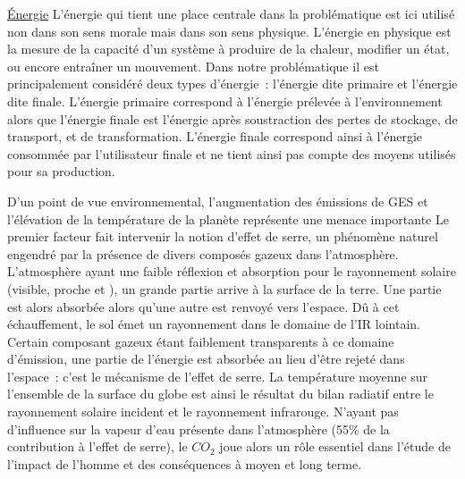\href{https://fr.wikipedia.org/wiki/%C3%89nergie_(physique)}{Énergie}
L’énergie qui tient une place centrale dans la problématique est ici utilisé non dans
son sens morale mais dans son sens physique. L’énergie en physique est la mesure
de la capacité d’un système à produire de la chaleur, modifier un état, ou encore
entraîner un mouvement. Dans notre problématique il est principalement considéré
deux types d’énergie~: l’énergie dite primaire et l’énergie dite finale.
L’énergie primaire correspond à l’énergie prélevée à l’environnement alors que l’énergie
finale est l’énergie après soustraction des pertes de stockage, de transport, et de
transformation. L’énergie finale correspond ainsi à l’énergie consommée par l’utilisateur
finale et ne tient ainsi pas compte des moyens utilisés pour sa production.


D’un point de vue environnemental, l’augmentation des émissions de GES et l’élévation
de la température de la planète représente une menace importante
Le premier facteur fait intervenir la notion d’effet de serre, un phénomène naturel
engendré par la présence de divers composés gazeux dans l’atmosphère.
L’atmosphère ayant une faible réflexion et absorption pour le rayonnement solaire
(visible, proche  et ), un grande partie arrive à la surface de la terre. Une
partie est alors absorbée alors qu’une autre est renvoyé vers l’espace. Dû à cet
échauffement, le sol émet un rayonnement dans le domaine de l’IR lointain. Certain
composant gazeux étant faiblement transparents à ce domaine d’émission, une partie
de l’énergie est absorbée au lieu d’être rejeté dans l’espace~: c’est le mécanisme
de l’effet de serre.
La température moyenne sur l’ensemble de la surface du globe est ainsi le résultat
du bilan radiatif entre le rayonnement solaire incident et le rayonnement infrarouge.
N’ayant pas d’influence sur la vapeur d’eau présente dans l’atmosphère
(55\% de la contribution à l’effet de serre), le $CO_{2}$ joue alors un rôle essentiel
dans l’étude de l’impact de l’homme et des conséquences à moyen et long terme.





